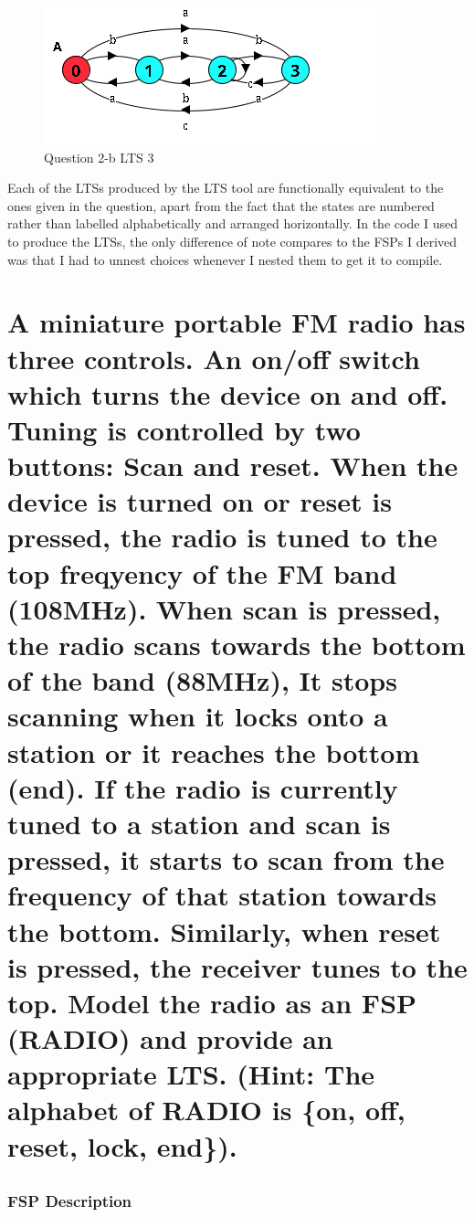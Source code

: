 \documentclass{article}[8pt]
\renewcommand{\thesubsubsection}{\thesection.\alph{subsection}.\Roman{subsubsection}}
\begin{document}
\begin{figure}[H]
	\includegraphics{./imgs/Question-2-b-iii.png}
	\caption{Question 2-b LTS 3}
	\label{fig:Question-2-b-iii-LTS}
\end{figure}

Each of the LTSs produced by the LTS tool are functionally equivalent to the ones given in the question, apart from the fact that the states are numbered rather than labelled alphabetically and arranged horizontally. In the code I used to produce the LTSs, the only difference of note compares to the FSPs I derived was that I had to unnest choices whenever I nested them to get it to compile.

\section[Question ~\thesection]{A miniature portable FM radio has three controls. An on/off switch which turns the device on and off. Tuning is controlled by two buttons: Scan and reset. When the device is turned on or reset is pressed, the radio is tuned to the top freqyency of the FM band (108MHz). When scan is pressed, the radio scans towards the bottom of the band (88MHz), It stops scanning when it locks onto a station or it reaches the bottom (end). If the radio is currently tuned to a station and scan is pressed, it starts to scan from the frequency of that station towards the bottom. Similarly, when reset is pressed, the receiver tunes to the top. Model the radio as an FSP (RADIO) and provide an appropriate LTS. (Hint: The alphabet of RADIO is \{on, off, reset, lock, end\}).}

\subsection{}

\subsubsection[~\thesubsubsection]{FSP Description}
\end{document}
